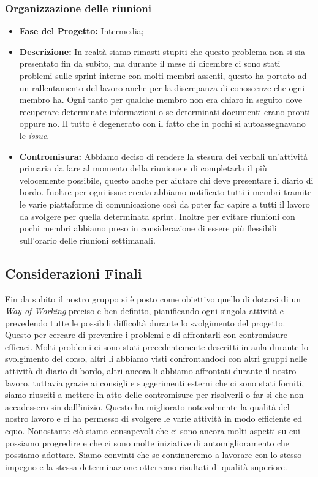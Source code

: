 \documentclass{article}
\begin{document}
\subsubsection{Organizzazione delle riunioni}
\begin{itemize}
    \item \textbf{Fase del Progetto:} Intermedia;
    \item \textbf{Descrizione:} In realtà siamo rimasti stupiti che questo problema non si sia presentato fin da subito, ma durante il mese di dicembre ci sono stati problemi sulle sprint interne con molti membri assenti, questo ha portato ad un rallentamento del lavoro anche per la discrepanza di conoscenze che ogni membro ha. Ogni tanto per qualche membro non era chiaro in seguito dove recuperare determinate informazioni o se determinati documenti erano pronti oppure no. Il tutto è degenerato con il fatto che in pochi si autoassegnavano le \textit{issue}.
    \item \textbf{Contromisura:} Abbiamo deciso di rendere la stesura dei verbali un'attività primaria da fare al momento della riunione e di completarla il più velocemente possibile, questo anche per aiutare chi deve presentare il diario di bordo. Inoltre per ogni issue creata abbiamo notificato tutti i membri tramite le varie piattaforme di comunicazione così da poter far capire a tutti il lavoro da svolgere per quella determinata sprint. Inoltre per evitare riunioni con pochi membri abbiamo preso in considerazione di essere più flessibili sull'orario delle riunioni settimanali.
\end{itemize}
\subsection{Considerazioni Finali}
Fin da subito il nostro gruppo si è posto come obiettivo quello di dotarsi di un \textit{Way of Working} preciso e ben definito, pianificando ogni singola attività e prevedendo tutte le possibili difficoltà durante lo svolgimento del progetto.
Questo per cercare di prevenire i problemi e di affrontarli con contromisure efficaci. Molti problemi ci sono stati precedentemente descritti in aula durante lo svolgimento del corso, altri li abbiamo visti confrontandoci con altri gruppi nelle attività di diario di bordo,
altri ancora li abbiamo affrontati durante il nostro lavoro, tuttavia grazie ai consigli e suggerimenti esterni che ci sono stati forniti, siamo riusciti a mettere in atto delle contromisure per risolverli o far sì che non accadessero sin dall'inizio.
Questo ha migliorato notevolmente la qualità del nostro lavoro e ci ha permesso di svolgere le varie attività in modo efficiente ed equo. Nonostante ciò siamo consapevoli che ci sono ancora molti aspetti su cui possiamo progredire e che ci sono molte iniziative di automiglioramento che possiamo adottare.
Siamo convinti che se continueremo a lavorare con lo stesso impegno e la stessa determinazione otterremo risultati di qualità superiore.
\end{document}
